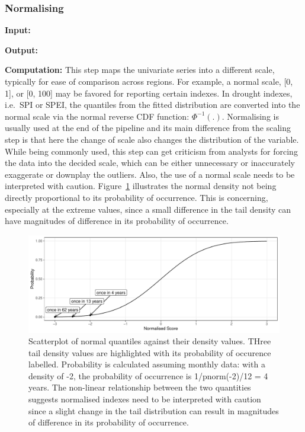 \documentclass[
]{interact}
\begin{document}
\hypertarget{normalising}{%
\subsubsection{Normalising}\label{normalising}}

\textbf{Input: }

\textbf{Output: }

\textbf{Computation:} This step maps the univariate series into a
different scale, typically for ease of comparison across regions. For
example, a normal scale, {[}0, 1{]}, or {[}0, 100{]} may be favored for
reporting certain indexes. In drought indexes, i.e.~SPI or SPEI, the
quantiles from the fitted distribution are converted into the normal
scale via the normal reverse CDF function: \(\Phi^{-1}(.)\). Normalising
is usually used at the end of the pipeline and its main difference from
the scaling step is that here the change of scale also changes the
distribution of the variable. While being commonly used, this step can
get criticism from analysts for forcing the data into the decided scale,
which can be either unnecessary or inaccurately exaggerate or downplay
the outliers. Also, the use of a normal scale needs to be interpreted
with caution. Figure~\ref{fig-normalising} illustrates the normal
density not being directly proportional to its probability of
occurrence. This is concerning, especially at the extreme values, since
a small difference in the tail density can have magnitudes of difference
in its probability of occurrence.

\begin{figure}

{\centering \includegraphics{tidyindex_files/figure-pdf/fig-normalising-1.pdf}

}

\caption{\label{fig-normalising}Scatterplot of normal quantiles against
their density values. THree tail density values are highlighted with its
probability of occurence labelled. Probability is calculated assuming
monthly data: with a density of -2, the probability of occurrence is
1/pnorm(-2)/12 = 4 years. The non-linear relationship between the two
quantities suggests normalised indexes need to be interpreted with
caution since a slight change in the tail distribution can result in
magnitudes of difference in its probability of occurrence.}

\end{figure}
\end{document}
